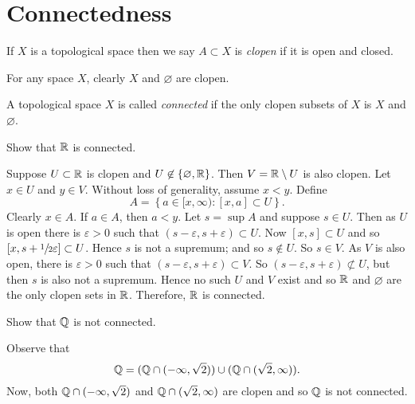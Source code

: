 
\section{Connectedness}

\begin{definition}[Clopen]
	If $X$ is a topological space then we say $A \subset X$ is \emph{clopen}
	if it is open and closed.
\end{definition}

For any space $X$, clearly $X$ and $\varnothing$ are clopen.

\begin{definition}[Connected]
	A topological space $X$ is called \emph{connected} if the only clopen
	subsets of $X$ is $X$ and $\varnothing$.
\end{definition}

\begin{problem}
	Show that $\mathbb{R}$ is connected.
\end{problem}

\begin{solution}
	Suppose $U \subset \mathbb{R}$ is clopen and $U \not\in \left\{
		\varnothing, \mathbb{R}
	\right\}$.
	Then $V = \mathbb{R} \setminus U$ is also clopen.
	Let $x \in U$ and $y \in V$.
	Without loss of generality, assume $x < y$.
	Define
	\[
		A = \left\{
			a \in [x, \infty):
			[x,a] \subset U
		\right\}.
	\]
	Clearly $x \in A$.
	If $a \in A$, then $a < y$.
	Let $s = \sup A$ and suppose $s \in U$.
	Then as $U$ is open there is $\varepsilon > 0$ such that
	$(s - \varepsilon, s + \varepsilon) \subset U$.
	Now $[x,s] \subset U$ and so $[x, s + \sfrac12 \varepsilon] \subset U$.
	Hence $s$ is not a supremum; and so $s \not\in U$.
	So $s \in V$.
	As $V$ is also open, there is $\varepsilon > 0$ such that
	$(s - \varepsilon, s + \varepsilon) \subset V$.
	So $(s - \varepsilon, s + \varepsilon) \not\subset U$,
	but then $s$ is also not a supremum.
	Hence no such $U$ and $V$ exist
	and so $\mathbb{R}$ and $\varnothing$ are the only clopen sets in $\mathbb{R}$.
	Therefore, $\mathbb{R}$ is connected.
\end{solution}

\begin{problem}
	Show that $\mathbb{Q}$ is not connected.
\end{problem}

\begin{solution}
	Observe that
	\[
		\mathbb{Q} = (\mathbb{Q} \cap (-\infty, \sqrt 2)) \cup (\mathbb{Q} \cap (\sqrt 2, \infty)).
	\]
	Now, both $\mathbb{Q} \cap (-\infty, \sqrt 2)$ and $\mathbb{Q} \cap (\sqrt 2, \infty)$
	are clopen and so $\mathbb{Q}$ is not connected.
\end{solution}

